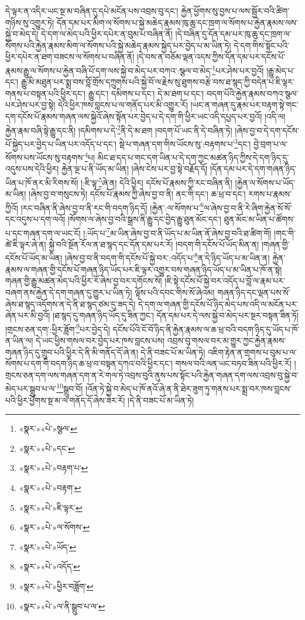 དེ་ལྟར་ན་འདིར་ཡང་སྔ་མ་བཞིན་དུ་དཔེ་མངོན་པས་འབྲས་བུ་དང་། རྐྱེན་ཕྱོགས་སུ་བྱས་པ་ལས་སྦྱོར་བའི་ཚིག་གཉིས་སུ་འགྱུར་ཏེ། དོན་དམ་པར་མིག་ལ་སོགས་པ་སྐྱེ་མཆེད་རྣམས་ཁུ་ཆུ་དང་ཁྲག་ལ་སོགས་པ་རྐྱེན་རྣམས་ལས་སྐྱེ་བ་མེད་དེ། དེ་དག་ལ་མེད་པའི་ཕྱིར་དཔེར་ན་བུམ་པ་བཞིན་ནོ། །དེ་བཞིན་དུ་དོན་དམ་པར་ཁུ་ཆུ་དང་ཁྲག་ལ་སོགས་པའི་རྐྱེན་རྣམས་མིག་ལ་སོགས་པའི་སྐྱེ་མཆེད་རྣམས་སྐྱེད་པར་བྱེད་པ་མ་ཡིན་ཏེ། དེ་དག་གིས་སྟོང་པའི་ཕྱིར་དཔེར་ན་ཐག་བཟངས་ལ་སོགས་པ་བཞིན་ནོ། །དེ་བས་ན་བཅོམ་ལྡན་འདས་ཀྱིས་དོན་དམ་པར་དངོས་པོ་རྣམས་རྒྱུ་ལ་སོགས་པ་རྐྱེན་བཞི་པོ་དག་ལས་སྐྱེ་བ་མེད་པར་བཀའ་:སྩལ་བ་མེད་\footnote{«སྣར་»«པེ་»སྩལ་}པར་ཤེས་པར་བྱའོ། །རྒྱུ་མེད་པ་དང་། རྒྱུ་མི་མཐུན་པར་སྨྲ་བས་བློ་གྲོས་དཀྲུགས་པའི་སྐྱེ་བོ་ལ་རྗེས་སུ་ཐུགས་བརྩེ་བས་ཐ་སྙད་ཀྱི་བདེན་པ་ཇི་ལྟར་གནས་པ་བསྟན་པའི་ཕྱིར་དང་། རྒྱུ་དང་། དམིགས་པ་དང་། དེ་མ་ཐག་པ་དང་། བདག་པོའི་རྐྱེན་རྣམས་བཀའ་སྩལ་པར་ཤེས་པར་བྱ་སྟེ། དེའི་ཕྱིར་ཁས་བླངས་པ་ལ་གནོད་པར་མི་འགྱུར་རོ། །ཡང་ན་གཞན་དུ་རྣམ་པར་བརྟག་སྟེ་གང་དག་དངོས་པོ་རྣམས་གཞན་ལས་སྐྱེའོ་ཞེས་སྟོན་པར་བྱེད་པ་དེ་དག་གི་ཕྱིར་ཡང་འདི་དཔྱད་པར་བྱའོ། །འདི་ལ། རྐྱེན་རྣམ་བཞི་སྟེ་རྒྱུ་དང་ནི། །དམིགས་པ་དེ་\footnote{«སྣར་»«པེ་»དང་}ནི་དེ་མ་ཐག །བདག་པོ་ཡང་ནི་དེ་བཞིན་ཏེ། །ཞེས་བྱ་བ་དེ་དག་དངོས་པོ་སྐྱེད་པར་བྱེད་པ་ཡིན་པར་འདོད་པ་དང་། སྡེ་པ་གཞན་དག་གིས་ཡོངས་སུ་:བརྟགས་པ་\footnote{«སྣར་»«པེ་»བརྟག་པ་}དང་། བྱེ་བྲག་པ་ལ་སོགས་པས་ཡོངས་སུ་བརྟགས་\footnote{«སྣར་»«པེ་»བརྟག་}པ། མིང་ཐ་དད་པ་གང་དག་ཡིན་པ་དེ་དག་ཀྱང་མཚན་ཉིད་ཀྱིས་དེ་དག་ཉིད་དུ་འདུས་པས་དེའི་ཕྱིར། རྐྱེན་ལྔ་པ་ནི་ཡོད་མ་ཡིན། །ཞེས་ངེས་པར་བྱ་སྟེ་བརྗོད་དོ། །དོན་དམ་པར་དེ་དག་གཞན་ཉིད་ཡིན་པ་ཁོ་ནར་མི་རིགས་སོ། །:ཇི་ལྟ་\footnote{«སྣར་»«པེ་»ཇི་ལྟར་}ཞེ་ན། དེའི་ཕྱིར། དངོས་པོ་རྣམས་ཀྱི་རང་བཞིན་ནི། །རྐྱེན་ལ་སོགས་པ་ཡོད་མ་ཡིན། །ཞེས་བྱ་བ་གསུངས་ཏེ། དངོས་པོ་རྣམས་ཀྱི་ཞེས་བྱ་བ་ནི། ནང་གི་དང་། ཆ་ཕྲ་བ་དང་། རགས་པ་རྣམས་ཀྱིའོ། །རང་བཞིན་ནི་ཞེས་བྱ་བ་ནི་རང་གི་བདག་ཉིད་དོ། །རྐྱེན་:ལ་སོགས་པ་\footnote{«སྣར་»«པེ་»ལ་སོགས་}ལ་ཞེས་བྱ་བ་ནི་རེ་ཞིག་རྐྱེན་སོ་སོ་དང་འདུས་པ་དག་ལའོ། །སོགས་ལ་ཞེས་བྱ་བའི་སྒྲས་ནི་རྒྱུ་དང་བྱེད་རྒྱུ་ཐུན་མོང་དང་། ཐུན་མོང་མ་ཡིན་པ་ཚོགས་པ་དང་གཞན་དག་ལ་ཡང་ངོ། །:ཡོད་པ་\footnote{«སྣར་»«པེ་»ཡོད་}མ་ཡིན་ཞེས་བྱ་བ་ནི་ཡོད་པ་མ་ཡིན་ནོ་ཞེས་བྱ་བའི་ཐ་ཚིག་གོ། །གང་གི་ཚེ་ཇི་ལྟར་ཞེ་ན། སྐྱེ་བའི་སྔོན་རོལ་ན་ཐ་སྙད་དང་དོན་དམ་པར་རོ། །བདག་གི་དངོས་པོ་ཡོད་མིན་ན། །གཞན་གྱི་དངོས་པོ་ཡོད་མ་ཡིན། །ཞེས་བྱ་བ་ནི་བདག་གི་དངོས་པོ་སྐྱེ་བར་:འདོད་པ་\footnote{«སྣར་»«པེ་»འདོད་}ན་དེ་ཉིད་ཡོད་པ་མ་ཡིན་ན། རྐྱེན་རྣམས་ལ་གཞན་གྱི་དངོས་པོ་གཞན་ཉིད་ཡོད་པར་ཇི་ལྟར་འགྱུར་བས་གཞན་ཉིད་ཡོད་པ་མ་ཡིན་པ་ཁོ་ན་སྟེ། གཞན་གྱི་རྒྱུ་མཚན་མེད་པའི་ཕྱིར་རོ་ཞེས་བྱ་བར་དགོངས་སོ། །ཇི་སྟེ་དངོས་པོ་སྐྱེ་བར་འདོད་པ་བློ་ལ་རྣམ་པར་བཞག་ནས་རྐྱེན་དེ་དག་གཞན་དུ་གྱུར་པ་ཡིན་ཏེ། ལྟོས་པའི་དབང་གིས་སོ་ཞེའམ། གཞན་ཉིད་དང་ལྡན་པས་སོ་ཞེས་ཐ་སྙད་འདོགས་ན་དེ་ནི་ཐ་སྙད་ཙམ་དུ་ཟད་དེ། དེ་དག་ལ་གཞན་གྱི་དངོས་པོ་ཉིད་མེད་པས་འདི་ལ་མངོན་པར་ཞེན་པར་མི་བྱའོ། །ཐ་སྙད་དུ་གཞན་ཉིད་ཡོད་དུ་ཟིན་ཀྱང་། དོན་དམ་པར་དེ་ལས་སྐྱེ་བ་མེད་པར་སྔར་བསྟན་ཟིན་ཏོ། །གྲངས་ཅན་དག་:ཕྱིར་ཟློག་\footnote{«སྣར་»«པེ་»ཕྱིར་བཟློག་}པར་བྱེད་དེ། དངོས་པོའི་ངོ་བོ་ཉིད་ནི་རྐྱེན་རྣམས་ལ་ཆ་ཕྲ་བའི་བདག་ཉིད་དུ་ཡོད་པ་ཁོ་ན་ཡིན་ལ། དེ་ཡང་ཕྱིས་གསལ་བར་བྱེད་པར་ཁས་བླངས་པས། འབྲས་བུ་གསལ་བར་མ་གྱུར་ཀྱང་རྐྱེན་རྣམས་གཞན་ཉིད་དུ་གྲུབ་པའི་ཕྱིར་དེ་ནི་མི་གནོད་དོ་ཞེ་ན། དེ་ནི་བཟང་པོ་མ་ཡིན་ཏེ། འཇིག་རྟེན་ན་གྲགས་པ་བུམ་པ་ལ་སོགས་པ་དག་གི་བདག་ཉིད་ཆ་ཕྲ་བ་བསྟན་དཀའ་བའི་ཕྱིར་དང་། གསལ་བའི་ལན་ཡང་བཏབ་ཟིན་པའི་ཕྱིར་རོ། །གྲངས་ཅན་དག་ལས་གཞན་དག་ན་རེ་གལ་ཏེ་འབྲས་བུའི་ནུས་པས་སྟོང་པའི་རྐྱེན་གཞན་དག་ལས་འབྲས་བུ་སྐྱེ་བ་མེད་པར་སྒྲུབ་པ་ལ་\footnote{«སྣར་»«པེ་»ལ་ནི་སྒྲུབ་པ་ལ་}སྒྲུབ་བོ། །འོན་ཏེ་སྐྱེ་བ་མེད་པ་ཁོ་ནའོ་ཞེ་ན་ནི་ཐེར་ཟུག་ཏུ་གནས་པར་སྨྲ་བར་ཁས་བླངས་པའི་ཕྱིར་ཕྱོགས་སྔ་མ་ལ་གནོད་དོ་ཞེས་ཟེར་རོ། །དེ་ནི་བཟང་པོ་མ་ཡིན་ཏེ། 